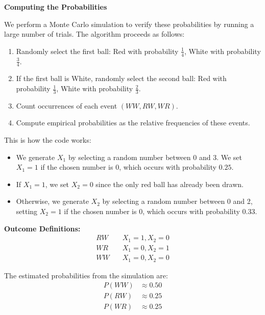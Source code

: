 \documentclass{beamer}
\numberwithin{equation}{section}
\begin{document}
\begin{frame}
\textbf{Computing the Probabilities}

We perform a Monte Carlo simulation to verify these probabilities by running a large number of trials. The algorithm proceeds as follows:
\begin{enumerate}
    \item Randomly select the first ball: Red with probability $\frac{1}{4}$, White with probability $\frac{3}{4}$.
    \item If the first ball is White, randomly select the second ball: Red with probability $\frac{1}{3}$, White with probability $\frac{2}{3}$.
    \item Count occurrences of each event $(WW, RW, WR)$.
    \item Compute empirical probabilities as the relative frequencies of these events.
\end{enumerate}
\end{frame}

\begin{frame}
This is how the code works:
\begin{itemize}
    \item We generate $X_1$ by selecting a random number between 0 and 3. We set $X_1 = 1$ if the chosen number is 0, which occurs with probability $0.25$.
    \item If $X_1 = 1$, we set $X_2 = 0$ since the only red ball has already been drawn.
    \item Otherwise, we generate $X_2$ by selecting a random number between 0 and 2, setting $X_2 = 1$ if the chosen number is 0, which occurs with probability $0.33$.
\end{itemize}
\end{frame}

\begin{frame}
\textbf{Outcome Definitions:}
\begin{align*}
    RW &\quad X_1 = 1, X_2 = 0 \\
    WR &\quad X_1 = 0, X_2 = 1 \\
    WW &\quad X_1 = 0, X_2 = 0
\end{align*}

The estimated probabilities from the simulation are:
\begin{align}
  P(WW) &\approx 0.50 \\
  P(RW) &\approx 0.25 \\
  P(WR) &\approx 0.25
\end{align}
\end{frame}
\end{document}
